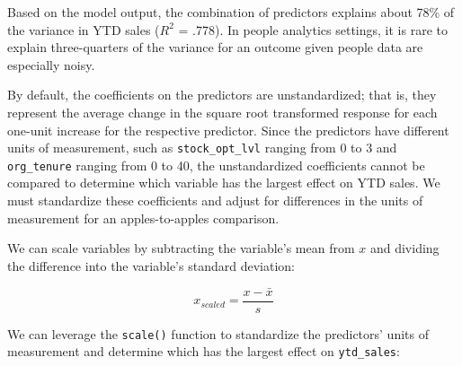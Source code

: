 \documentclass[
]{book}
\begin{document}
Based on the model output, the combination of predictors explains about 78\% of the variance in YTD sales (\(R^2\) = .778). In people analytics settings, it is rare to explain three-quarters of the variance for an outcome given people data are especially noisy.

By default, the coefficients on the predictors are unstandardized; that is, they represent the average change in the square root transformed response for each one-unit increase for the respective predictor. Since the predictors have different units of measurement, such as \texttt{stock\_opt\_lvl} ranging from 0 to 3 and \texttt{org\_tenure} ranging from 0 to 40, the unstandardized coefficients cannot be compared to determine which variable has the largest effect on YTD sales. We must standardize these coefficients and adjust for differences in the units of measurement for an apples-to-apples comparison.

We can scale variables by subtracting the variable's mean from \(x\) and dividing the difference into the variable's standard deviation:

\[ x_{scaled} = \frac{x - \bar{x}} {s} \]

We can leverage the \texttt{scale()} function to standardize the predictors' units of measurement and determine which has the largest effect on \texttt{ytd\_sales}:

\providecommand{\docline}[3]{\noalign{\global\setlength{\arrayrulewidth}{#1}}\arrayrulecolor[HTML]{#2}\cline{#3}}

\setlength{\tabcolsep}{2pt}

\renewcommand*{\arraystretch}{1.5}
\end{document}
